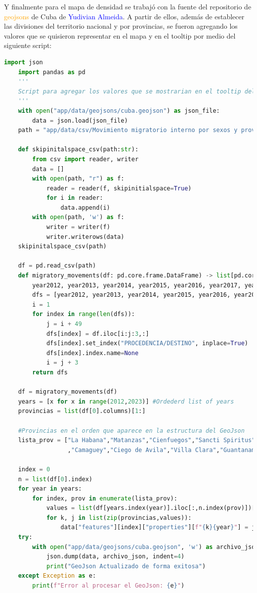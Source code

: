 \documentclass{article}
\begin{document}
Y finalmente para el mapa de densidad se trabajó con la fuente del repositorio de \textcolor{orange}{geojsons} de Cuba de \textcolor{blue}{Yudivian Almeida}. A partir de ellos, además de establecer 
las divisiones del territorio nacional y por provincias, se fueron agregando los valores que se quisieron representar en el mapa y en el tooltip por medio del siguiente script:
\begin{lstlisting}[language=Python, caption=Script para agregar valores al geojson]
    import json 
    import pandas as pd
    '''
    Script para agregar los valores que se mostrarian en el tooltip del mapa al geojson
    '''
    with open("app/data/geojsons/cuba.geojson") as json_file:
        data = json.load(json_file)
    path = "app/data/csv/Movimiento migratorio interno por sexos y provincias.csv"
    
    def skipinitalspace_csv(path:str):
        from csv import reader, writer
        data = []
        with open(path, "r") as f:
            reader = reader(f, skipinitialspace=True)
            for i in reader:
                data.append(i)
        with open(path, 'w') as f:
            writer = writer(f)
            writer.writerows(data)
    skipinitalspace_csv(path)
    
    df = pd.read_csv(path)
    def migratory_movements(df: pd.core.frame.DataFrame) -> list[pd.core.frame.DataFrame]:
        year2012, year2013, year2014, year2015, year2016, year2017, year2018, year2019, year2020, year2021, year2022 = 0,0,0,0,0,0,0,0,0,0,0
        dfs = [year2012, year2013, year2014, year2015, year2016, year2017, year2018, year2019, year2020, year2021, year2022]
        i = 1
        for index in range(len(dfs)):
            j = i + 49
            dfs[index] = df.iloc[i:j:3,:]
            dfs[index].set_index("PROCEDENCIA/DESTINO", inplace=True)
            dfs[index].index.name=None
            i = j + 3
        return dfs
    
    df = migratory_movements(df)
    years = [x for x in range(2012,2023)] #Ordederd list of years
    provincias = list(df[0].columns)[1:]
    
    #Provincias en el orden que aparece en la estructura del GeoJson
    lista_prov = ["La Habana","Matanzas","Cienfuegos","Sancti Spiritus","Las Tunas","Holguin","Granma","Santiago de Cuba","Isla de la Juventud"
                  ,"Camaguey","Ciego de Avila","Villa Clara","Guantanamo","Pinar del Rio","Artemisa","Mayabeque"] 
    
    index = 0
    n = list(df[0].index)
    for year in years:    
        for index, prov in enumerate(lista_prov):
            values = list(df[years.index(year)].iloc[:,n.index(prov)])[1:]
            for k, j in list(zip(provincias,values)):
                data["features"][index]["properties"][f"{k}{year}"] = j    
    try:
        with open("app/data/geojsons/cuba.geojson", 'w') as archivo_json:
            json.dump(data, archivo_json, indent=4)
            print("GeoJson Actualizado de forma exitosa")
    except Exception as e:
        print(f"Error al procesar el GeoJson: {e}") 
\end{lstlisting}
\end{document}
